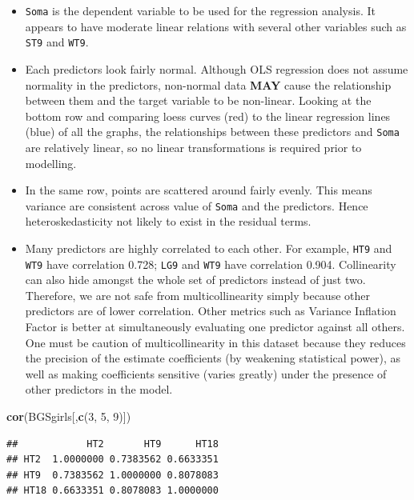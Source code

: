 \documentclass[]{article}
\newenvironment{Shaded}{\begin{snugshade}}{\end{snugshade}}
\newcommand{\KeywordTok}[1]{\textcolor[rgb]{0.13,0.29,0.53}{\textbf{#1}}}
\newcommand{\DecValTok}[1]{\textcolor[rgb]{0.00,0.00,0.81}{#1}}
\newcommand{\NormalTok}[1]{#1}
\begin{document}
\begin{itemize}
\item
  \texttt{Soma} is the dependent variable to be used for the regression
  analysis. It appears to have moderate linear relations with several
  other variables such as \texttt{ST9} and \texttt{WT9}.
\item
  Each predictors look fairly normal. Although OLS regression does not
  assume normality in the predictors, non-normal data \textbf{MAY} cause
  the relationship between them and the target variable to be
  non-linear. Looking at the bottom row and comparing loess curves (red)
  to the linear regression lines (blue) of all the graphs, the
  relationships between these predictors and \texttt{Soma} are
  relatively linear, so no linear transformations is required prior to
  modelling. 
\item
  In the same row, points are scattered around fairly evenly. This means
  variance are consistent across value of \texttt{Soma} and the
  predictors. Hence heteroskedasticity not likely to exist in the
  residual terms.
\item
  Many predictors are highly correlated to each other. For example,
  \texttt{HT9} and \texttt{WT9} have correlation 0.728; \texttt{LG9} and
  \texttt{WT9} have correlation 0.904. Collinearity can also hide
  amongst the whole set of predictors instead of just two. Therefore, we
  are not safe from multicollinearity simply because other predictors
  are of lower correlation. Other metrics such as Variance Inflation
  Factor is better at simultaneously evaluating one predictor against
  all others. One must be caution of multicollinearity in this dataset
  because they reduces the precision of the estimate coefficients (by
  weakening statistical power), as well as making coefficients sensitive
  (varies greatly) under the presence of other predictors in the model.
\end{itemize}

\begin{Shaded}
\begin{Highlighting}[]
\KeywordTok{cor}\NormalTok{(BGSgirls[,}\KeywordTok{c}\NormalTok{(}\DecValTok{3}\NormalTok{, }\DecValTok{5}\NormalTok{, }\DecValTok{9}\NormalTok{)])}
\end{Highlighting}
\end{Shaded}

\begin{verbatim}
##            HT2       HT9      HT18
## HT2  1.0000000 0.7383562 0.6633351
## HT9  0.7383562 1.0000000 0.8078083
## HT18 0.6633351 0.8078083 1.0000000
\end{verbatim}
\end{document}

